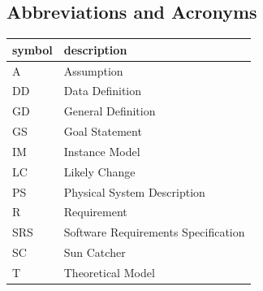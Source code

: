 \documentclass[12pt]{article}
\begin{document}
\subsection{Abbreviations and Acronyms}

\renewcommand{\arraystretch}{1.2}
\begin{tabular}{l l} 
  \toprule		
  \textbf{symbol} & \textbf{description}\\
  \midrule 
  A & Assumption\\
  DD & Data Definition\\
  GD & General Definition\\
  GS & Goal Statement\\
  IM & Instance Model\\
  LC & Likely Change\\
  PS & Physical System Description\\
  R & Requirement\\
  SRS & Software Requirements Specification\\
  SC & Sun Catcher\\
  T & Theoretical Model\\
  \bottomrule
\end{tabular}\\

\newpage

\end{document}

